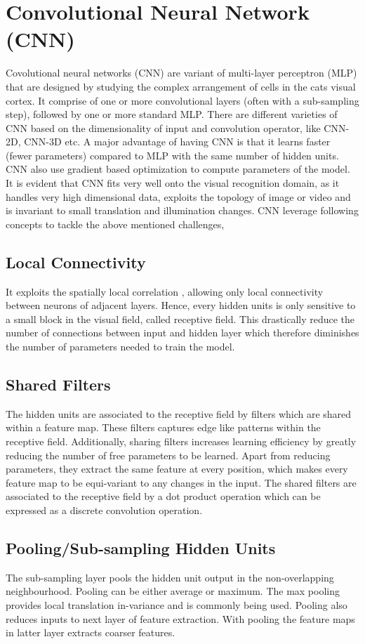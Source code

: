 \section{Convolutional Neural Network (CNN)}
 \label{sec:cnn}
 \par Covolutional neural networks (CNN) are variant of multi-layer perceptron (MLP) that are designed by studying the complex arrangement of cells in the cats visual cortex. It comprise of one or more convolutional layers (often with a sub-sampling step), followed by one or more standard MLP. There are different varieties of CNN based on the dimensionality of input and convolution operator, like CNN-2D, CNN-3D etc. A major advantage of having CNN is that it learns faster (fewer parameters) compared to  MLP with the same number of hidden units. CNN  also use  gradient based optimization to compute parameters of the model. It is  evident that CNN fits very well onto the visual recognition domain, as it handles very high dimensional data, exploits the topology of image or video and is invariant to small translation and illumination changes.  CNN leverage following concepts to tackle the above mentioned challenges,
\subsection{Local Connectivity}
It exploits the spatially local correlation , allowing only local connectivity between neurons of adjacent layers. Hence, every hidden units is only sensitive to a small block in the visual field, called receptive field. This drastically reduce the number of connections between input and hidden layer which therefore diminishes the number of parameters needed to train the model.
\subsection{Shared Filters}
The hidden units are associated to the receptive field by filters which are shared within a feature map. These filters captures edge like patterns within the receptive field. Additionally, sharing filters increases learning efficiency by greatly reducing the number of free parameters to be learned. Apart from reducing parameters, they extract the same feature at every position, which makes every feature map to be equi-variant to any changes in the input. The shared filters are associated to the receptive field by a dot product operation which can be expressed as a discrete convolution operation.
\subsection{Pooling/Sub-sampling Hidden Units}
The sub-sampling layer pools the hidden unit output in the non-overlapping neighbourhood. Pooling can be either average or maximum.  The max pooling provides local translation in-variance and is commonly being used. Pooling also reduces inputs to next layer of feature extraction. With pooling the feature maps in latter layer extracts coarser features.


